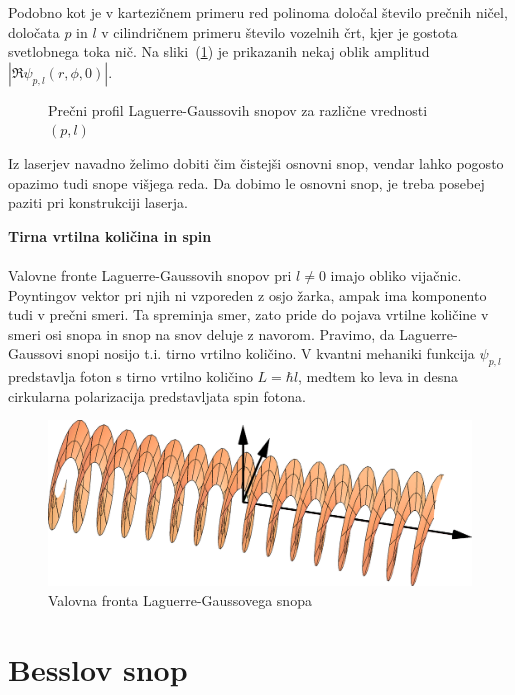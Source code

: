 Podobno kot je v kartezičnem primeru red polinoma določal število prečnih ničel,
določata $p$ in $l$ v cilindričnem primeru število vozelnih črt, kjer je gostota 
svetlobnega toka nič. Na sliki~(\ref{fig:Laguerrovi_presek})
je prikazanih nekaj oblik amplitud $|\Re\psi_{p,l}(r,\phi,0)|$.

\begin{figure}[h]
\centering
\def\svgwidth{110truemm} 

\caption{Prečni profil Laguerre-Gaussovih snopov za različne vrednosti $(p,l)$}
\label{fig:Laguerrovi_presek}
\end{figure}

Iz laserjev navadno želimo dobiti čim čistejši osnovni snop, vendar
lahko pogosto opazimo tudi snope višjega reda. Da dobimo le osnovni
snop, je treba posebej paziti pri konstrukciji laserja.

\begin{remark}{{\bf Tirna vrtilna količina in spin}}\\ \\
Valovne fronte Laguerre-Gaussovih snopov pri $l\ne0$ imajo obliko vijačnic. Poyntingov 
vektor pri njih ni vzporeden z osjo žarka, ampak ima komponento tudi v prečni smeri. Ta spreminja smer, 
zato pride do pojava vrtilne količine v smeri osi snopa in snop na snov deluje z navorom. 
Pravimo, da Laguerre-Gaussovi snopi nosijo t.i. tirno vrtilno količino. 
V kvantni mehaniki funkcija $\psi_{p,l}$ predstavlja foton s tirno vrtilno količino $L = \hbar l$, 
medtem ko leva in desna cirkularna polarizacija predstavljata spin fotona. 
\begin{figure}[h]
\centering
\includegraphics[width=10truecm]{slike/03_Laguerre_faza.png}
\caption{Valovna fronta Laguerre-Gaussovega snopa}
\label{fig:Laguerrova_fronta}
\end{figure}
\end{remark}

\section{Besslov snop}

